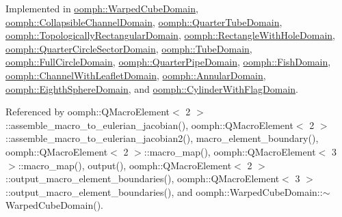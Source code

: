 Implemented in \hyperlink{classoomph_1_1WarpedCubeDomain_a4e021719488897307d141fe4df327e49}{oomph\+::\+Warped\+Cube\+Domain}, \hyperlink{classoomph_1_1CollapsibleChannelDomain_a2c0a5bd21e12fbcc1cdd753c0f205da2}{oomph\+::\+Collapsible\+Channel\+Domain}, \hyperlink{classoomph_1_1QuarterTubeDomain_afacee4fe8a6fbc33618643398f5b8ab1}{oomph\+::\+Quarter\+Tube\+Domain}, \hyperlink{classoomph_1_1TopologicallyRectangularDomain_a4de4d505233303cee0690ee87e45b4cf}{oomph\+::\+Topologically\+Rectangular\+Domain}, \hyperlink{classoomph_1_1RectangleWithHoleDomain_a514085f80059aa9f0cc3334a3cb408c1}{oomph\+::\+Rectangle\+With\+Hole\+Domain}, \hyperlink{classoomph_1_1QuarterCircleSectorDomain_a9faddf9d13e0a7633f732bac1ddda80b}{oomph\+::\+Quarter\+Circle\+Sector\+Domain}, \hyperlink{classoomph_1_1TubeDomain_a1f16dde7ad082e2557dff9c737dae6c0}{oomph\+::\+Tube\+Domain}, \hyperlink{classoomph_1_1FullCircleDomain_a93253d6c878c3ab40a582e0d2070a69d}{oomph\+::\+Full\+Circle\+Domain}, \hyperlink{classoomph_1_1QuarterPipeDomain_ae8cc6433c58dcfb265335744ed8a330a}{oomph\+::\+Quarter\+Pipe\+Domain}, \hyperlink{classoomph_1_1FishDomain_a383b0fb396d605932ba6fb0779dacbf9}{oomph\+::\+Fish\+Domain}, \hyperlink{classoomph_1_1ChannelWithLeafletDomain_ae4b123847f4ab6e242a0409d72fe5cbd}{oomph\+::\+Channel\+With\+Leaflet\+Domain}, \hyperlink{classoomph_1_1AnnularDomain_ade8cfa0e6f2d41e7d3877250321bfff3}{oomph\+::\+Annular\+Domain}, \hyperlink{classoomph_1_1EighthSphereDomain_a281727105819669ea9dab9fec120ea63}{oomph\+::\+Eighth\+Sphere\+Domain}, and \hyperlink{classoomph_1_1CylinderWithFlagDomain_a40bca9a30f1f874c043e68621b28de74}{oomph\+::\+Cylinder\+With\+Flag\+Domain}.



Referenced by oomph\+::\+Q\+Macro\+Element$<$ 2 $>$\+::assemble\+\_\+macro\+\_\+to\+\_\+eulerian\+\_\+jacobian(), oomph\+::\+Q\+Macro\+Element$<$ 2 $>$\+::assemble\+\_\+macro\+\_\+to\+\_\+eulerian\+\_\+jacobian2(), macro\+\_\+element\+\_\+boundary(), oomph\+::\+Q\+Macro\+Element$<$ 2 $>$\+::macro\+\_\+map(), oomph\+::\+Q\+Macro\+Element$<$ 3 $>$\+::macro\+\_\+map(), output(), oomph\+::\+Q\+Macro\+Element$<$ 2 $>$\+::output\+\_\+macro\+\_\+element\+\_\+boundaries(), oomph\+::\+Q\+Macro\+Element$<$ 3 $>$\+::output\+\_\+macro\+\_\+element\+\_\+boundaries(), and oomph\+::\+Warped\+Cube\+Domain\+::$\sim$\+Warped\+Cube\+Domain().

\mbox{\label{classoomph_1_1Domain_a9d293b736e74bfeace64c1c8858add8a}} 

